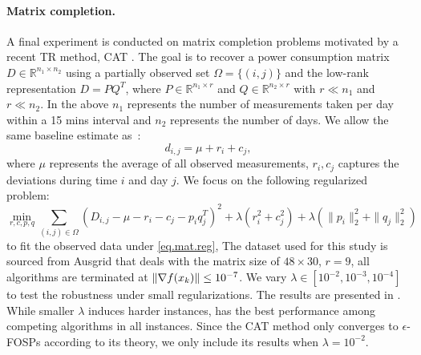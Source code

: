 \paragraph{Matrix completion.}
A final experiment is conducted on matrix completion problems motivated by a recent TR method, CAT \citep{hamad2022consistently}. The goal is to recover a power consumption matrix $D \in \mathbb{R}^{n_1 \times n_2}$ using a partially observed set $\Omega = \{(i, j)\}$ and the low-rank representation $D = PQ^T$, where $P \in \mathbb{R}^{n_1 \times r}$ and $Q \in \mathbb{R}^{n_2 \times r}$ with $r \ll n_1$ and $r \ll n_2$. In the above $n_1$ represents the
number of measurements taken per day within a 15 mins interval and $n_2$ represents the number
of days. We allow the same baseline estimate as~\cite{hamad2022consistently}:
\begin{equation}\label{eq.mat.reg}
d_{i,j} = \mu + r_i + c_j,
\end{equation}
where $\mu$ represents the average of all observed measurements, $r_i,c_j$ captures the deviations during time $i$ and day $j$. We focus on the following regularized problem:
$$
\min_{r,c,p,q} \sum_{(i,j) \in \Omega} (D_{i,j} - \mu - r_i - c_j - p_i q_j^T)^2 + \lambda (r_i^2 + c_j^2) + \lambda (\|p_i\|^2_2 + \|q_j\|^2_2)
$$
to fit the observed data under \eqref{eq.mat.reg}, 
The dataset used for this study is sourced from Ausgrid \citep{hamad2022consistently} that deals with the matrix size of $48 \times 30$, $r=9$, all algorithms are terminated at $\|\nabla f(x_k)\| \le 10^{-7}$. We vary $\lambda \in [10^{-2},10^{-3},10^{-4}]$ to test the robustness under small regularizations. The results are presented in . While smaller $\lambda$ induces harder instances, \iutrhvp{} has the best performance among competing algorithms in all instances.  Since the CAT method only converges to $\epsilon$-FOSPs according to its theory, we only include its results when $\lambda = 10^{-2}$.


